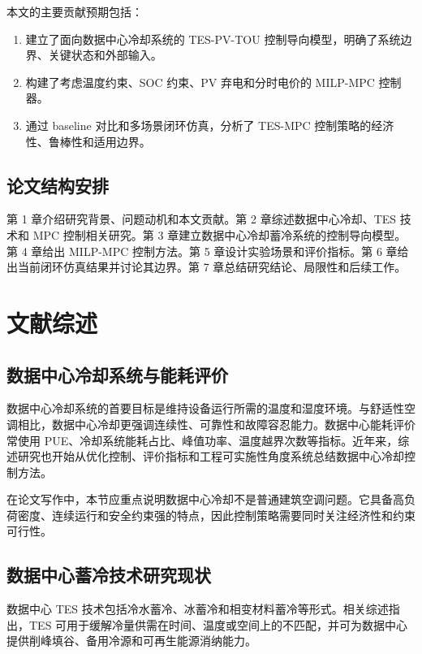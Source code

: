 \documentclass[UTF8,a4paper,12pt]{ctexrep}
\begin{document}
本文的主要贡献预期包括：

\begin{enumerate}[label=(\arabic*)]
  \item 建立了面向数据中心冷却系统的 TES-PV-TOU 控制导向模型，明确了系统边界、关键状态和外部输入。
  \item 构建了考虑温度约束、SOC 约束、PV 弃电和分时电价的 MILP-MPC 控制器。
  \item 通过 baseline 对比和多场景闭环仿真，分析了 TES-MPC 控制策略的经济性、鲁棒性和适用边界。
\end{enumerate}

\section{论文结构安排}

第 1 章介绍研究背景、问题动机和本文贡献。第 2 章综述数据中心冷却、TES 技术和 MPC 控制相关研究。第 3 章建立数据中心冷却蓄冷系统的控制导向模型。第 4 章给出 MILP-MPC 控制方法。第 5 章设计实验场景和评价指标。第 6 章给出当前闭环仿真结果并讨论其边界。第 7 章总结研究结论、局限性和后续工作。

\chapter{文献综述}

\section{数据中心冷却系统与能耗评价}

数据中心冷却系统的首要目标是维持设备运行所需的温度和湿度环境。与舒适性空调相比，数据中心冷却更强调连续性、可靠性和故障容忍能力。数据中心能耗评价常使用 PUE、冷却系统能耗占比、峰值功率、温度越界次数等指标。近年来，综述研究也开始从优化控制、评价指标和工程可实施性角度系统总结数据中心冷却控制方法\citep{chang2024datacenterCoolingReview}。

在论文写作中，本节应重点说明数据中心冷却不是普通建筑空调问题。它具备高负荷密度、连续运行和安全约束强的特点，因此控制策略需要同时关注经济性和约束可行性。

\section{数据中心蓄冷技术研究现状}

数据中心 TES 技术包括冷水蓄冷、冰蓄冷和相变材料蓄冷等形式。相关综述指出，TES 可用于缓解冷量供需在时间、温度或空间上的不匹配，并可为数据中心提供削峰填谷、备用冷源和可再生能源消纳能力\citep{liu2020tesDatacenterReview}。
\end{document}

